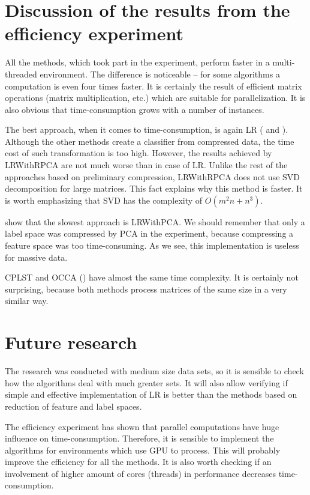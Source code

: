 \documentclass[english,a4paper,twoside]{ppfcmthesis}
\begin{document}
\section{Discussion of the results from the efficiency experiment}

All the methods, which took part in the experiment, perform faster in a multi-threaded environment. The difference is noticeable -- for some algorithms a computation is even four times faster. It is certainly the result of efficient matrix operations (matrix multiplication, etc.) which are suitable for parallelization. It is also obvious that time-consumption grows with a number of instances.

The best approach, when it comes to time-consumption, is again LR ( and ). Although the other methods create a classifier from compressed data, the time cost of such transformation is too high. However, the results achieved by LRWithRPCA are not much worse than in case of LR. Unlike the rest of the approaches based on preliminary compression, LRWithRPCA does not use SVD decomposition for large matrices. This fact explains why this method is faster. It is worth emphasizing that SVD has the complexity of $O(m^2n+n^3)$. 

 show that the slowest approach is LRWithPCA. We should remember that only a label space was compressed by PCA in the experiment, because compressing a feature space was too time-consuming. As we see, this implementation is useless for massive data. 

CPLST and OCCA () have almost the same time complexity. It is certainly not surprising, because both methods process matrices of the same size in a very similar way.

\section{Future research}

The research was conducted with medium size data sets, so it is sensible to check how the algorithms deal with much greater sets. It will also allow verifying if simple and effective implementation of LR is better than the methods based on reduction of feature and label spaces. 

The efficiency experiment has shown that parallel computations have huge influence on time-consumption. Therefore, it is sensible to implement the algorithms for environments which use GPU to process. This will probably improve the efficiency for all the methods. It is also worth checking if an involvement of higher amount of cores (threads) in performance decreases time-consumption.  
\end{document}
